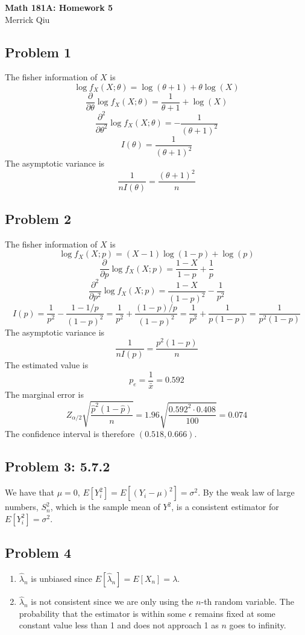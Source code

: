 \documentclass{article}
\begin{document}
\begin{center}
	\huge{\bf Math 181A: Homework 5} \\
	Merrick Qiu 
\end{center}

\subsection*{Problem 1}
The fisher information of $X$ is 
\[
	\log f_X(X;\theta) 
	= \log(\theta+1) + \theta \log(X)
\]
\[
	\frac{\partial}{\partial \theta} \log f_X(X;\theta) 
	= \frac{1}{\theta+1} + \log(X)
\]
\[
	\frac{\partial^2}{\partial \theta^2} \log f_X(X;\theta) 
	= -\frac{1}{(\theta+1)^2}
\]
\[
	I(\theta) = \frac{1}{(\theta+1)^2}
\]
The asymptotic variance is 
\[
	\frac{1}{nI(\theta)} = \frac{(\theta+1)^2}{n}
\]
\newpage

\subsection*{Problem 2}
The fisher information of $X$ is 
\[
	\log f_X(X;p) 
	= (X-1)\log(1-p) + \log(p)
\]
\[
	\frac{\partial}{\partial p} \log f_X(X;p) 
	= \frac{1-X}{1-p} + \frac{1}{p}
\]
\[
	\frac{\partial^2}{\partial p^2} \log f_X(X;p)
	= \frac{1-X}{(1-p)^2} - \frac{1}{p^2}
\]
\[
	I(p) 
	= \frac{1}{p^2} - \frac{1-1/p}{(1-p)^2}
	= \frac{1}{p^2} + \frac{(1-p)/p}{(1-p)^2}
	= \frac{1}{p^2} + \frac{1}{p(1-p)}
	= \frac{1}{p^2(1-p)}
\]
The asymptotic variance is 
\[
	\frac{1}{nI(p)}
	= \frac{p^2(1-p)}{n}
\]
The estimated value is 
\[
	p_e = \frac{1}{\bar{x}} = 0.592
\]
The marginal error is 
\[
	Z_{\alpha/2}\sqrt{\frac{\hat{p}^2(1-\hat{p})}{n}}
	= 1.96\sqrt{\frac{0.592^2\cdot0.408}{100}}
	=0.074
\]
The confidence interval is therefore $(0.518, 0.666)$.
\newpage 

\subsection*{Problem 3: 5.7.2}
We have that $\mu=0$, $E[Y_i^2] = E[(Y_i-\mu)^2] = \sigma^2$.
By the weak law of large numbers, $S_n^2$, which is the sample mean of $Y^2$,
is a consistent estimator for $E[Y_i^2] = \sigma^2$.
\newpage 

\subsection*{Problem 4}
\begin{enumerate}
	\item $\hat{\lambda}_n$ is unbiased since
	$E[\hat{\lambda}_n] = E[X_n] = \lambda$.
	\item $\hat{\lambda}_n$ is not consistent since 
	we are only using the $n$-th random variable.
	The probability that the estimator is within some $\epsilon$
	remains fixed at some constant value less than 1
	and does not approach 1 as $n$ goes to infinity.
\end{enumerate}
\newpage 
\end{document}
